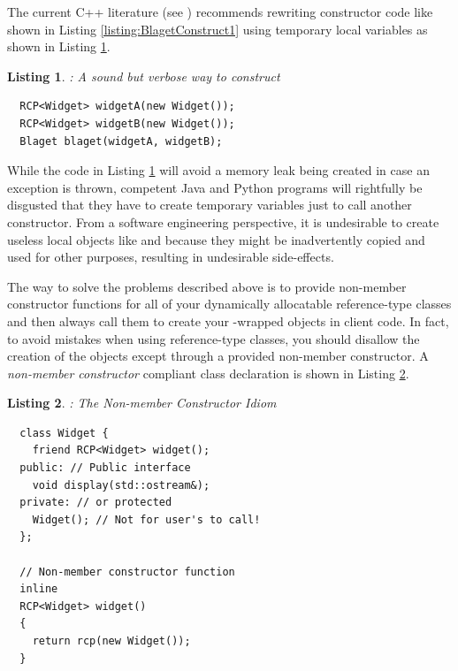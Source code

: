 \documentclass[pdf,ps2pdf,11pt]{SANDreport}
\newtheorem{listing}{Listing}
\begin{document}
The current C++ literature (see {}\cite[Item
13]{C++CodingStandards05}) recommends rewriting constructor code like
shown in Listing {}\ref{listing:BlagetConstruct1} using temporary local
variables as shown in Listing {}\ref{listing:BlagetConstruct2}.

\begin{listing}: A sound but verbose way to construct \\
\label{listing:BlagetConstruct2}
{\small\begin{verbatim}
  RCP<Widget> widgetA(new Widget());
  RCP<Widget> widgetB(new Widget());
  Blaget blaget(widgetA, widgetB);
\end{verbatim}}
\end{listing}

While the code in Listing {}\ref{listing:BlagetConstruct2} will avoid a
memory leak being created in case an exception is thrown, competent
Java and Python programs will rightfully be disgusted that they have
to create temporary variables just to call another constructor.  From
a software engineering perspective, it is undesirable to create
useless local {} objects like {} and
{} because they might be inadvertently copied and used
for other purposes, resulting in undesirable side-effects.

The way to solve the problems described above is to provide non-member
constructor functions for all of your dynamically allocatable
reference-type classes and then always call them to create your
{}-wrapped objects in client code.  In fact, to avoid
mistakes when using reference-type classes, you should disallow the
creation of the objects except through a provided non-member
constructor.  A {}\textit{non-member constructor} compliant
{} class declaration is shown in Listing
{}\ref{listing:WidgetNonmemberConstructor}.

\begin{listing}: The Non-member Constructor Idiom\\
\label{listing:WidgetNonmemberConstructor}
{\small\begin{verbatim}
  class Widget {
    friend RCP<Widget> widget();
  public: // Public interface
    void display(std::ostream&);
  private: // or protected
    Widget(); // Not for user's to call!
  };

  // Non-member constructor function
  inline
  RCP<Widget> widget()
  {
    return rcp(new Widget());
  }
\end{verbatim}}
\end{listing}
\end{document}
